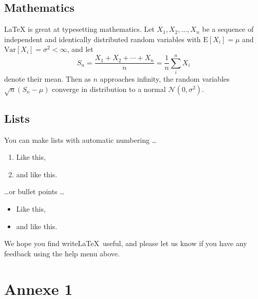 
\subsection{Mathematics}

\LaTeX{} is great at typesetting mathematics. Let $X_1, X_2, \ldots, X_n$ be a sequence of independent and identically distributed random variables with $\text{E}[X_i] = \mu$ and $\text{Var}[X_i] = \sigma^2 < \infty$, and let
$$S_n = \frac{X_1 + X_2 + \cdots + X_n}{n}
      = \frac{1}{n}\sum_{i}^{n} X_i$$
denote their mean. Then as $n$ approaches infinity, the random variables $\sqrt{n}(S_n - \mu)$ converge in distribution to a normal $\mathcal{N}(0, \sigma^2)$.

\subsection{Lists}

You can make lists with automatic numbering \dots

\begin{enumerate}
\item Like this,
\item and like this.
\end{enumerate}
\dots or bullet points \dots
\begin{itemize}
\item Like this,
\item and like this.
\end{itemize}

We hope you find write\LaTeX\ useful, and please let us know if you have any feedback using the help menu above.

\appendix
\section{Annexe 1}
\label{sec:Annexe 1}



